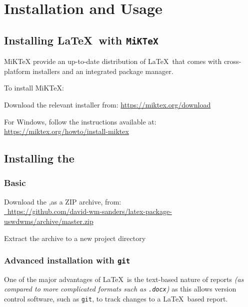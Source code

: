 \section{Installation and Usage}
\subsection{Installing \LaTeX\ with \texttt{MiKTeX}}
MiKTeX provide an up-to-date distribution of \LaTeX\ that comes with cross-platform installers and an integrated package manager.

To install MiKTeX:
\begin{methodology0}
  \item Download the relevant installer from: \href{https://miktex.org/download}{https://miktex.org/download}
  \item For Windows, follow the instructions available at: \href{https://miktex.org/howto/install-miktex}{https://miktex.org/howto/install-miktex}
\end{methodology0}

\subsection{Installing the \uswdwmspkg{}}
\subsubsection{Basic}
\begin{methodology0}
  \item Download the \uswdwmspkg{},as a ZIP archive, from:\\
    \href{https://github.com/david-wm-sanders/latex-package-uswdwms/archive/master.zip}{\faGithub\ https://github.com/david-wm-sanders/latex-package-uswdwms/archive/master.zip}
  \item Extract the archive to a new project directory
\end{methodology0}

\subsubsection{Advanced installation with \texttt{git}}
\label{primer:sec:advancedinstallation}
One of the major advantages of \LaTeX\ is the text-based nature of reports \textit{(as compared to more complicated formats such as \texttt{.docx})} as this allows version control software, such as \texttt{git}, to track changes to a \LaTeX\ based report.

